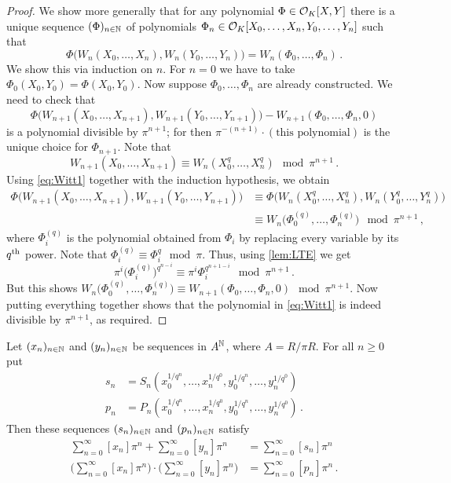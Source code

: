 \documentclass[a4paper, 10pt, oneside, DIV=9, chapterprefix=true, numbers=enddot,bibliography=totoc]{scrbook}
\begin{document}
\begin{proof}%
	We show more generally that for any polynomial $\Phi\in\mathcal{O}_K[X,Y]$ there is a unique sequence $(\Phi)_{n\in\mathbb{N}}$ of polynomials $\Phi_n\in\mathcal{O}_K[X_0,\dotsc,X_n,Y_0,\dotsc,Y_n]$ such that
	\begin{equation*}
		\Phi\big(W_n(X_0,\dotsc,X_n),W_n(Y_0,\dotsc,Y_n)\big)=W_n(\Phi_0,\dotsc,\Phi_n)\,.
	\end{equation*}
	We show this via induction on $n$. For $n=0$ we have to take $\Phi_0(X_0,Y_0)=\Phi(X_0,Y_0)$. Now suppose $\Phi_0,\dotsc,\Phi_n$ are already constructed. We need to check that
	\begin{equation}\label{eq:Witt1}
		\Phi\big(W_{n+1}(X_0,\dotsc,X_{n+1}),W_{n+1}(Y_0,\dotsc,Y_{n+1})\big)-W_{n+1}(\Phi_0,\dotsc,\Phi_n,0)
	\end{equation}
	is a polynomial divisible by $\pi^{n+1}$; for then $\pi^{-(n+1)}\cdot(\text{this polynomial})$ is the unique choice for $\Phi_{n+1}$. Note that 
	\begin{equation}\label{eq:Witt2}
		W_{n+1}(X_0,\dotsc,X_{n+1})\equiv W_n\left(X_0^q,\dotsc,X_n^q\right)\mod\pi^{n+1}\,.
	\end{equation}
	Using \cref{eq:Witt1} together with the induction hypothesis, we obtain
	\begin{align*}
		\Phi\big(W_{n+1}(X_0,\dotsc,X_{n+1}),W_{n+1}(Y_0,\dotsc,Y_{n+1})\big)&\equiv \Phi\big(W_n(X_0^q,\dotsc,X_n^q),W_n(Y_0^q,\dotsc,Y_n^q)\big)\\
		&\equiv W_n\big(\Phi_0^{(q)},\dotsc,\Phi_n^{(q)}\big)\mod \pi^{n+1}\,,
	\end{align*}
	where $\Phi_i^{(q)}$ is the polynomial obtained from $\Phi_i$ by replacing every variable by its $q^{\text{th}}$ power. Note that $\Phi_i^{(q)}\equiv \Phi_i^q\mod \pi$. Thus, using \cref{lem:LTE} we get
	\begin{equation*}
		\pi^i\big(\Phi_i^{(q)}\big)^{q^{n-i}}\equiv \pi^i\Phi_i^{q^{n+1-i}}\mod \pi^{n+1}\,.
	\end{equation*}
	But this shows $W_n\big(\Phi_0^{(q)},\dotsc,\Phi_n^{(q)}\big)\equiv W_{n+1}(\Phi_0,\dotsc,\Phi_n,0)\mod \pi^{n+1}$. Now putting everything together shows that the polynomial in \cref{eq:Witt1} is indeed divisible by $\pi^{n+1}$, as required.
\end{proof}
\begin{cor}\label{cor:snpn}
	Let $(x_n)_{n\in\mathbb{N}}$ and $(y_n)_{n\in\mathbb{N}}$ be sequences in $A^{\mathbb{N}}$, where $A=R/\pi R$. For all $n\geq 0$ put
	\begin{align*}
		s_n&=S_n\left(x_0^{1/q^n},\dotsc,x_n^{1/q^0},y_0^{1/q^n},\dotsc,y_n^{1/q^0}\right)\\
		p_n&=P_n\left(x_0^{1/q^n},\dotsc,x_n^{1/q^0},y_0^{1/q^n},\dotsc,y_n^{1/q^0}\right)\,. 
	\end{align*}
	Then these sequences $(s_n)_{n\in\mathbb{N}}$ and $(p_n)_{n\in\mathbb{N}}$ satisfy
	\begin{align*}
		\sum_{n=0}^\infty[x_n]\pi^n+\sum_{n=0}^\infty[y_n]\pi^n&=\sum_{n=0}^\infty[s_n]\pi^n\\
		\Bigg(\sum_{n=0}^\infty[x_n]\pi^n\Bigg)\cdot\Bigg(\sum_{n=0}^\infty[y_n]\pi^n\Bigg)&=\sum_{n=0}^\infty[p_n]\pi^n\,.
	\end{align*}
\end{cor}
\end{document}

